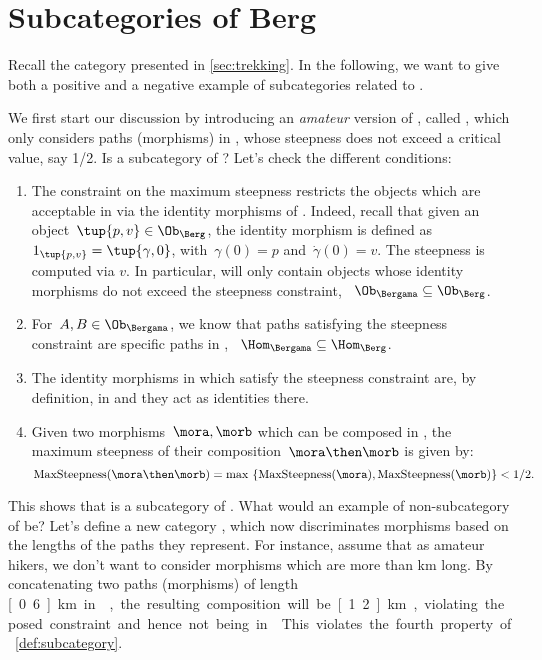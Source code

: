 \section{Subcategories of Berg}
\label{sec:subcat_berg}

Recall the category \Berg presented in \cref{sec:trekking}. In the following, we want to give both a positive and a negative example of subcategories related to \Berg.


We first start our discussion by introducing an \emph{amateur} version of \Berg, called \Bergama, which only considers paths (morphisms) in \Berg, whose steepness does not exceed a critical value, say 1/2. Is \Bergama a subcategory of \Berg? Let's check the different conditions:
\begin{enumerate}
  \item The constraint on the maximum steepness restricts the objects which are acceptable in \Bergama via the identity morphisms of \Berg. Indeed, recall that given an object~$\tup{p,v}\in \Ob_{\Berg}$, the identity morphism is defined as~$1_{\tup{p,v}}=\tup{\gamma,0}$, with~$\gamma(0)=p$ and~$\dot{\gamma}(0)=v$. The steepness is computed via $v$. In particular, \Bergama will only contain objects whose identity morphisms do not exceed the steepness constraint, \ie ~$\Ob_\Bergama \subseteq \Ob_\Berg$.
  \item For~$A,B\in \Ob_{\Bergama}$, we know that paths satisfying the steepness constraint are specific paths in \Berg, \ie ~$\Hom_{\Bergama}\subseteq \Hom_{\Berg}$.
  \item The identity morphisms in \Berg which satisfy the steepness constraint are, by definition, in \Bergama and they act as identities there.
  \item Given two morphisms~$\mora,\morb$ which can be composed in \Bergama, the maximum steepness of their composition~$\mora \then \morb$ is given by:
  \begin{equation*}
    \text{MaxSteepness}(\mora \then \morb)=\max \ \{\text{MaxSteepness}(\mora),\text{MaxSteepness}(\morb)\}<1/2.
  \end{equation*}
\end{enumerate}

This shows that \Bergama is a subcategory of \Berg. What would an example of non-subcategory of \Berg be? Let's define a new category \Berglazy, which now discriminates morphisms based on the lengths of the paths they represent. For instance, assume that as amateur hikers, we don't want to consider morphisms which are more than \unit[1]{km} long. By concatenating two paths (morphisms) of length \unit[0.6]{km} in \Berglazy, the resulting composition will be \unit[1.2]{km}, violating the posed constraint and hence not being in \Berglazy. This violates the fourth property of \cref{def:subcategory}.


